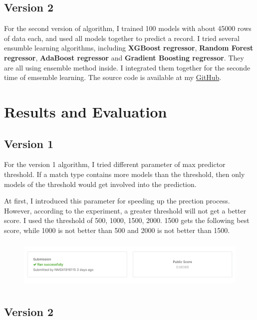 \documentclass[journal=jacsat,manuscript=article]{achemso}
\begin{document}
\subsection{Version 2}

For the second version of algorithm, I trained 100 models with about 45000 rows of data each,
and used all models together to predict a record. I tried several ensumble learning algorithms,
including \textbf{XGBoost regressor}, \textbf{Random Forest regressor}, \textbf{AdaBoost regressor}
and \textbf{Gradient Boosting regressor}. They are all using ensemble method inside.
I integrated them together for the seconde time of emsemble learning.
The source code is available at my
\href{https://github.com/mrdrivingduck/pugb-finish-placement-prediction/blob/master/src/main_ensemble.py}{GitHub}.

\section{Results and Evaluation}

\subsection{Version 1}

For the version 1 algorithm, I tried different parameter of max predictor threshold.
If a match type contains more models than the threshold, then only models of the
threshold would get involved into the prediction.

At first, I introduced this parameter for speeding up the prection process. However,
according to the experiment, a greater threshold will not get a better score.
I used the threshold of 500, 1000, 1500, 2000. 1500 gets the following best score, while 1000
is not better than 500 and 2000 is not better than 1500.

\begin{figure}
  \includegraphics[height=2.4cm]{img/res-version-1.png}
\end{figure}

\subsection{Version 2}
\end{document}

